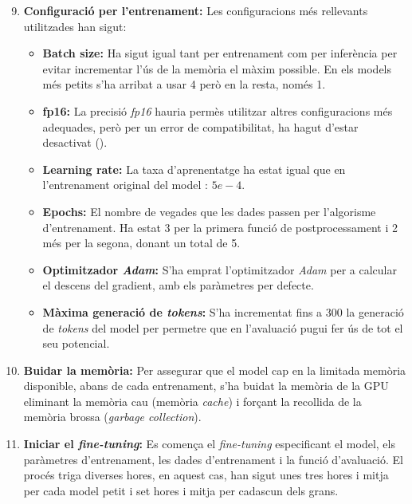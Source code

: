 \begin{enumerate}
    \setcounter{enumi}{8}
    \item \textbf{Configuració per l'entrenament:} Les configuracions més rellevants utilitzades han sigut:
        \begin{itemize}
            \item \textbf{Batch size:} Ha sigut igual tant per entrenament com per inferència per evitar incrementar l'ús de la memòria el màxim possible. En els models més petits s'ha arribat a usar 4 però en la resta, només 1.
            \item \textbf{fp16:} La precisió \textit{fp16} hauria permès utilitzar altres configuracions més adequades, però per un error de compatibilitat, ha hagut d'estar desactivat ().
            \item \textbf{Learning rate:} La taxa d'aprenentatge ha estat igual que en l'entrenament original del model \cite{flan-t5}: $5e-4$.
            \item \textbf{Epochs:} El nombre de vegades que les dades passen per l'algorisme d'entrenament. Ha estat 3 per la primera funció de postprocessament i 2 més per la segona, donant un total de 5.
            \item \textbf{Optimitzador \textit{Adam}:} S'ha emprat l'optimitzador \textit{Adam} per a calcular el descens del gradient, amb els paràmetres per defecte.
            \item \textbf{Màxima generació de \textit{tokens}:} S'ha incrementat fins a 300 la generació de \textit{tokens} del model per permetre que en l'avaluació pugui fer ús de tot el seu potencial.
        \end{itemize}
    \item \textbf{Buidar la memòria:} Per assegurar que el model cap en la limitada memòria disponible, abans de cada entrenament, s'ha buidat la memòria de la GPU eliminant la memòria cau (memòria \textit{cache}) i forçant la recollida de la memòria brossa (\textit{garbage collection}).
    \item \textbf{Iniciar el \textit{fine-tuning}:} Es comença el \textit{fine-tuning} especificant el model, els paràmetres d'entrenament, les dades d'entrenament i la funció d'avaluació. El procés triga diverses hores, en aquest cas, han sigut unes tres hores i mitja per cada model petit i set hores i mitja per cadascun dels grans.
\end{enumerate}
